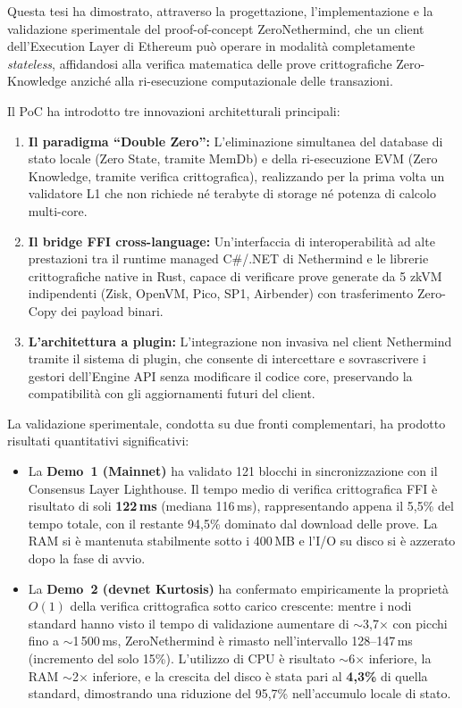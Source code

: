\documentclass[12pt,a4paper,openright,twoside]{report}
\begin{document}
Questa tesi ha dimostrato, attraverso la progettazione, l'implementazione e la validazione sperimentale del proof-of-concept ZeroNethermind, che un client dell'Execution Layer di Ethereum può operare in modalità completamente \textit{stateless}, affidandosi alla verifica matematica delle prove crittografiche Zero-Knowledge anziché alla ri-esecuzione computazionale delle transazioni.

Il PoC ha introdotto tre innovazioni architetturali principali:
\begin{enumerate}
    \item \textbf{Il paradigma ``Double Zero'':} L'eliminazione simultanea del database di stato locale (Zero State, tramite MemDb) e della ri-esecuzione EVM (Zero Knowledge, tramite verifica crittografica), realizzando per la prima volta un validatore L1 che non richiede né terabyte di storage né potenza di calcolo multi-core.
    \item \textbf{Il bridge FFI cross-language:} Un'interfaccia di interoperabilità ad alte prestazioni tra il runtime managed C\#/.NET di Nethermind e le librerie crittografiche native in Rust, capace di verificare prove generate da 5 zkVM indipendenti (Zisk, OpenVM, Pico, SP1, Airbender) con trasferimento Zero-Copy dei payload binari.
    \item \textbf{L'architettura a plugin:} L'integrazione non invasiva nel client Nethermind tramite il sistema di plugin, che consente di intercettare e sovrascrivere i gestori dell'Engine API senza modificare il codice core, preservando la compatibilità con gli aggiornamenti futuri del client.
\end{enumerate}

La validazione sperimentale, condotta su due fronti complementari, ha prodotto risultati quantitativi significativi:
\begin{itemize}
    \item La \textbf{Demo~1 (Mainnet)} ha validato 121 blocchi in sincronizzazione con il Consensus Layer Lighthouse. Il tempo medio di verifica crittografica FFI è risultato di soli \textbf{122\,ms} (mediana 116\,ms), rappresentando appena il 5,5\% del tempo totale, con il restante 94,5\% dominato dal download delle prove. La RAM si è mantenuta stabilmente sotto i 400\,MB e l'I/O su disco si è azzerato dopo la fase di avvio.
    \item La \textbf{Demo~2 (devnet Kurtosis)} ha confermato empiricamente la proprietà $O(1)$ della verifica crittografica sotto carico crescente: mentre i nodi standard hanno visto il tempo di validazione aumentare di $\sim$3,7$\times$ con picchi fino a $\sim$1\,500\,ms, ZeroNethermind è rimasto nell'intervallo 128--147\,ms (incremento del solo 15\%). L'utilizzo di CPU è risultato $\sim$6$\times$ inferiore, la RAM $\sim$2$\times$ inferiore, e la crescita del disco è stata pari al \textbf{4,3\%} di quella standard, dimostrando una riduzione del 95,7\% nell'accumulo locale di stato.
\end{itemize}
\end{document}
